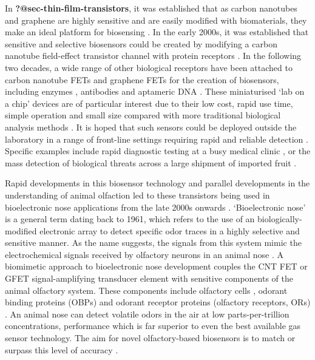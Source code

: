 \documentclass[
  a4paper,
]{scrbook}
\begin{document}
In \textbf{?@sec-thin-film-transistors}, it was established that as
carbon nanotubes and graphene are highly sensitive and are easily
modified with biomaterials, they make an ideal platform for biosensing
\autocite{Kauffman2008,Ohno2010}. In the early 2000s, it was established
that sensitive and selective biosensors could be created by modifying a
carbon nanotube field-effect transistor channel with protein receptors
\autocite{Chen2003,Kauffman2008}. In the following two decades, a wide
range of other biological receptors have been attached to carbon
nanotube FETs and graphene FETs for the creation of biosensors,
including enzymes \autocite{Lee2009,Zhang2015a,Dudina2019}, antibodies
\autocite{Kim2008,Jin2015,Tsang2019} and aptameric DNA
\autocite{Maehashi2007,Gao2016,Nguyen2021}. These miniaturised `lab on a
chip' devices are of particular interest due to their low cost, rapid
use time, simple operation and small size compared with more traditional
biological analysis methods \autocite{Kauffman2008}. It is hoped that
such sensors could be deployed outside the laboratory in a range of
front-line settings requiring rapid and reliable detection
\autocite{Dung2018,Yang2018,Kim2022a}. Specific examples include rapid
diagnostic testing at a busy medical clinic \autocite{Lim2014}, or the
mass detection of biological threats across a large shipment of imported
fruit \autocite{B3,Queensland}.

Rapid developments in this biosensor technology and parallel
developments in the understanding of animal olfaction led to these
transistors being used in bioelectronic nose applications from the late
2000s onwards \autocite{Yoon2009,Jin2012,Lee2012b,Park2012}.
`Bioelectronic nose' is a general term dating back to 1961, which refers
to the use of an biologically-modified electronic array to detect
specific odor traces in a highly selective and sensitive manner. As the
name suggests, the signals from this system mimic the electrochemical
signals received by olfactory neurons in an animal nose
\autocite{Kwon2015,Dung2018,Goodwin2021}. A biomimetic approach to
bioelectronic nose development couples the CNT FET or GFET
signal-amplifying transducer element with sensitive components of the
animal olfactory system. These components include olfactory cells
\autocite{Wang2007}, odorant binding proteins (OBPs)
\autocite{Larisika2015,Kotlowski2018} and odorant receptor proteins
(olfactory receptors, ORs) \autocite{Yang2018,Murugathas2020}. An animal
nose can detect volatile odors in the air at low parts-per-trillion
concentrations, performance which is far superior to even the best
available gas sensor technology. The aim for novel olfactory-based
biosensors is to match or surpass this level of accuracy
\autocite{Kwon2015,Dung2018,Kim2022a}.
\end{document}
